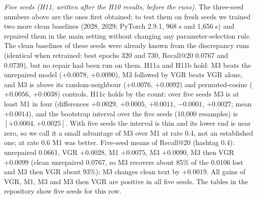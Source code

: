\documentclass[conference]{IEEEtran}
\begin{document}
\emph{Five seeds (H11, written after the H10 results, before the runs).} The three-seed numbers above are the ones first obtained; to test them on fresh seeds we trained two more clean baselines (2028, 2029; PyTorch 2.9.1, 968 s and 1,656 s) and repaired them in the main setting without changing any parameter-selection rule. The clean baselines of these seeds were already known from the discrepancy runs (identical when retrained: best epochs 320 and 730, Recall@20 0.0767 and 0.0739), but no repair had been run on them. H11a and H11b hold: M3 beats the unrepaired model ($+0.0078$, $+0.0090$), M3 followed by VGR beats VGR alone, and M3 is above its random-neighbour ($+0.0076$, $+0.0092$) and permuted-cosine ($+0.0056$, $+0.0038$) controls. H11c holds by the count: over five seeds M3 is at least M1 in four (differences $+0.0029$, $+0.0005$, $+0.0011$, $-0.0001$, $+0.0027$; mean $+0.0014$), and the bootstrap interval over the five seeds (10,000 resamples) is $[+0.0004, +0.0025]$. With five seeds the interval is thin and its lower end is near zero, so we call it a small advantage of M3 over M1 at rate 0.4, not an established one; at rate 0.6 M1 was better. Five-seed means of Recall@20 (hashtag 0.4): unrepaired 0.0661, VGR $+0.0028$, M1 $+0.0075$, M3 $+0.0090$, M3 then VGR $+0.0099$ (clean unrepaired 0.0767, so M3 recovers about 85\% of the 0.0106 lost and M3 then VGR about 93\%); M3 changes clean text by $+0.0019$. All gains of VGR, M1, M3 and M3 then VGR are positive in all five seeds. The tables in the repository show five seeds for this row.
\end{document}

